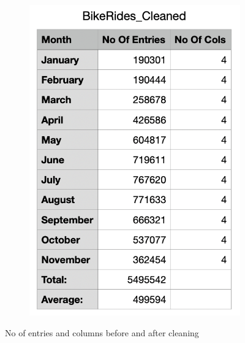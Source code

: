 \documentclass[12pt]{article}
\begin{document}
\begin{itemize}
\begin{figure}[h]
\begin{subfigure}{.4\textwidth}
		\includegraphics[scale=0.5]{img4.png}
	\end{subfigure}
	\caption{No of entries and columns before and after cleaning}
	\label{fig5}
	\end{figure}
	
	\end{itemize}

\pagebreak
\end{document}
